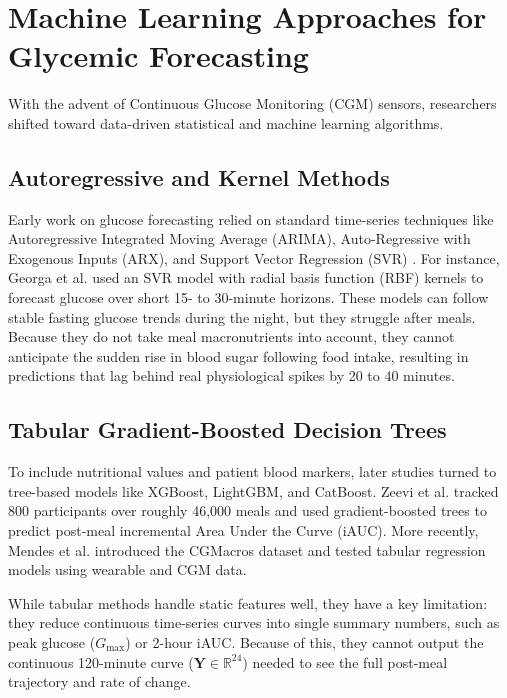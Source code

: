 \section{Machine Learning Approaches for Glycemic Forecasting}
With the advent of Continuous Glucose Monitoring (CGM) sensors, researchers shifted toward data-driven statistical and machine learning algorithms.

\subsection{Autoregressive and Kernel Methods}
Early work on glucose forecasting relied on standard time-series techniques like Autoregressive Integrated Moving Average (ARIMA), Auto-Regressive with Exogenous Inputs (ARX), and Support Vector Regression (SVR) \cite{georga2013evaluating}. For instance, Georga et al. \cite{georga2013evaluating} used an SVR model with radial basis function (RBF) kernels to forecast glucose over short 15- to 30-minute horizons. These models can follow stable fasting glucose trends during the night, but they struggle after meals. Because they do not take meal macronutrients into account, they cannot anticipate the sudden rise in blood sugar following food intake, resulting in predictions that lag behind real physiological spikes by 20 to 40 minutes.

\subsection{Tabular Gradient-Boosted Decision Trees}
To include nutritional values and patient blood markers, later studies turned to tree-based models like XGBoost, LightGBM, and CatBoost. Zeevi et al. \cite{zeevi2015personalized} tracked 800 participants over roughly 46,000 meals and used gradient-boosted trees to predict post-meal incremental Area Under the Curve (iAUC). More recently, Mendes et al. \cite{mendes2024cgmacros} introduced the CGMacros dataset and tested tabular regression models using wearable and CGM data.

While tabular methods handle static features well, they have a key limitation: they reduce continuous time-series curves into single summary numbers, such as peak glucose ($G_{\max}$) or 2-hour iAUC. Because of this, they cannot output the continuous 120-minute curve ($\mathbf{Y} \in \mathbb{R}^{24}$) needed to see the full post-meal trajectory and rate of change.

